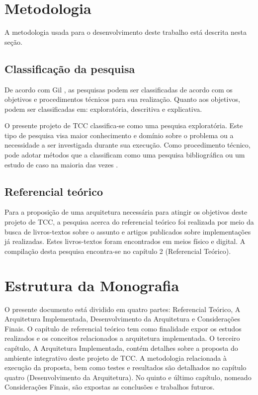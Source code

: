 \section{Metodologia}
A metodologia usada para o desenvolvimento deste trabalho está descrita nesta seção. 

\subsection{Classificação da pesquisa}
De acordo com Gil \cite{gil_como_2008}, as pesquisas podem ser classificadas de acordo com os objetivos e procedimentos técnicos para sua realização. Quanto aos objetivos, podem ser classificadas em: exploratória, descritiva e explicativa. 

O presente projeto de TCC classifica-se como uma pesquisa exploratória. Este tipo de pesquisa visa maior conhecimento e domínio sobre o problema ou a necessidade a ser investigada durante sua execução. Como procedimento técnico, pode adotar métodos que a classificam como uma pesquisa bibliográfica ou um estudo de caso na maioria das vezes \cite{gil_como_2008}.

\subsection{Referencial teórico}
Para a proposição de uma arquitetura necessária para atingir os objetivos deste projeto de TCC, a pesquisa acerca do referencial teórico foi realizada por meio da busca de livros-textos sobre o assunto e artigos publicados sobre implementações já realizadas. Estes livros-textos foram encontrados em meios físico e digital. A compilação desta pesquisa encontra-se no capítulo 2 (Referencial Teórico).

\section{Estrutura da Monografia}
O presente documento está dividido em quatro partes: Referencial Teórico, A Arquitetura Implementada, Desenvolvimento da Arquitetura e Considerações Finais. O capítulo de referencial teórico tem como finalidade expor os estudos realizados e os conceitos relacionados a arquitetura implementada. O terceiro capítulo, A Arquitetura Implementada, contém detalhes sobre a proposta do ambiente integrativo deste projeto de TCC. A metodologia relacionada à execução da proposta, bem como testes e resultados são detalhados no capítulo quatro (Desenvolvimento da Arquitetura). No quinto e último capítulo, nomeado Considerações Finais, são expostas as conclusões e trabalhos futuros.